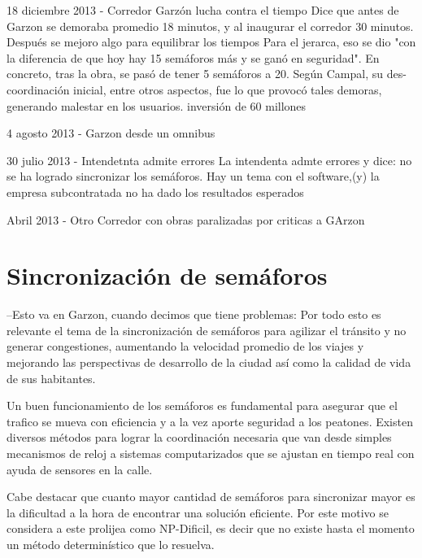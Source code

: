 18 diciembre 2013 - Corredor Garzón lucha contra el tiempo %
Dice que antes de Garzon se demoraba promedio 18 minutos, y al inaugurar el corredor 30 minutos. Después se mejoro algo para equilibrar los tiempos
Para el jerarca, eso se dio "con la diferencia de que hoy hay 15 semáforos más y se ganó en seguridad". En concreto, tras la obra, se pasó de tener 5 semáforos a 20. Según Campal, su des-coordinación inicial, entre otros aspectos, fue lo que provocó tales demoras, generando malestar en los usuarios.
inversión de 60 millones


4 agosto 2013 - Garzon desde un omnibus %


30 julio 2013  - Intendetnta admite errores %
La intendenta admte errores y dice: no se ha logrado sincronizar los semáforos. Hay un tema con el software,(y) la empresa subcontratada no ha dado los resultados esperados


Abril 2013 - Otro Corredor con obras paralizadas por criticas a GArzon


\section{Sincronización de semáforos}
--Esto va en Garzon, cuando decimos que tiene problemas:
Por todo esto es relevante el tema de la sincronización de semáforos para agilizar el tránsito y no generar congestiones, aumentando la velocidad promedio de los viajes y mejorando las perspectivas de desarrollo de la ciudad así como la calidad de vida de sus habitantes.


Un buen funcionamiento de los semáforos es fundamental para asegurar que el trafico se mueva con eficiencia y a la vez aporte seguridad a los peatones. 
Existen diversos métodos para lograr la coordinación necesaria que van desde simples mecanismos de reloj a sistemas computarizados que se ajustan en tiempo real con ayuda de sensores en la calle.

Cabe destacar que cuanto mayor cantidad de semáforos para sincronizar mayor es la dificultad a la hora de encontrar una solución eficiente. Por este motivo se considera a este prolijea como NP-Dificil, es decir que no existe hasta el momento un método determinístico que lo resuelva.


